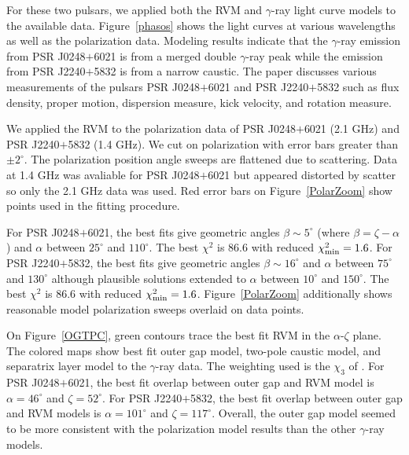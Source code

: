 For these two pulsars, we applied both the RVM and $\gamma$-ray light curve models
to the available data.
Figure~\ref{phasos} shows the light curves at various wavelengths
as well as the polarization data.
Modeling results indicate that the $\gamma$-ray emission from PSR J0248$+$6021
is from a merged double $\gamma$-ray peak while the emission from 
PSR J2240$+$5832 is from a narrow caustic.
The paper discusses various measurements of the
pulsars PSR J0248$+$6021 and PSR J2240$+$5832 such as
flux density, proper motion, dispersion measure, kick velocity, and rotation
measure. 

We applied the RVM to the polarization data of 
PSR J0248$+$6021 (2.1 GHz) and PSR J2240$+$5832 (1.4 GHz).  
We cut on polarization with error bars greater than
 $\pm 2^\circ$.
The polarization position angle sweeps are flattened
due to scattering.  Data at 1.4 GHz was avaliable for PSR J0248$+$6021
but appeared distorted by scatter so only the 2.1 GHz data was used.
Red error bars on Figure~\ref{PolarZoom} show points
used in the fitting procedure.  

For PSR J0248$+$6021, the best fits give geometric angles $\beta\sim5^\circ$ 
(where $\beta=\zeta-\alpha$) and $\alpha$ between $25^\circ$ and $110^\circ$.
The best $\chi^2$ is 86.6 with reduced $\chi_{\rm{min}}^2=1.6$.
For PSR J2240$+$5832, the best fits give geometric angles $\beta\sim16^\circ$ and $\alpha$ between $75^\circ$ and $130^\circ$
although plausible solutions extended to $\alpha$ between $10^\circ$ and $150^\circ$.
The best $\chi^2$ is 86.6 with reduced $\chi_{\rm{min}}^2=1.6$.
Figure~\ref{PolarZoom} additionally shows reasonable model polarization sweeps
overlaid on data points.

On Figure~\ref{OGTPC}, green contours trace the best fit RVM in the $\alpha$-$\zeta$ plane.
The colored maps show best fit outer gap model, two-pole caustic model, 
and separatrix layer model \citep{bai2010modeling} to the $\gamma$-ray data.
The weighting used is the $\chi_3$ of \cite{romani2010constraining}.
For PSR J0248$+$6021, the best fit overlap between outer gap and RVM
model is $\alpha=46^\circ$ and $\zeta=52^\circ$.
For PSR J2240$+$5832, the best fit overlap between outer gap and RVM
models is $\alpha=101^\circ$ and $\zeta=117^\circ$.
Overall, the outer gap model seemed to be more consistent
with the polarization model results
than the other $\gamma$-ray models.



